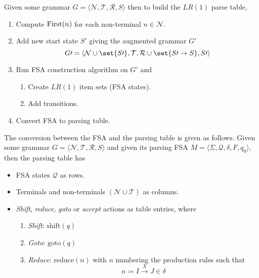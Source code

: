 \begin{definition}
    Given some grammar $G = \langle \mathcal{N}, \mathcal{T}, \mathcal{R}, S \rangle$ then to build the $LR(1)$ parse table,
    \begin{enumerate}
        \item Compute $\mathrm{First}{(n)}$ for each non-terminal $n \in \mathcal{N}$.
        \item Add new start state $S\prime$ giving the augmented grammar $G\prime$
        \begin{equation}
            G\prime = \langle \mathcal{N} \cup \set{S\prime}, \mathcal{T}, \mathcal{R} \cup \set{S\prime \to S}, S\prime \rangle
        \end{equation}
        \item Run FSA construction algorithm on $G\prime$ and
        \begin{enumerate}
            \item Create $LR(1)$ item sets (FSA states).
            \item Add transitions.
        \end{enumerate}
        \item Convert FSA to parsing table.
    \end{enumerate}
    
    The conversion between the FSA and the parsing table is given as follows. Given some grammar $G = \langle \mathcal{N}, \mathcal{T}, \mathcal{R}, S \rangle$ and given its parsing FSA $M = \langle \Sigma, \mathcal{Q}, \delta, F, q_0 \rangle$, then the parsing table has
    \begin{itemize}
        \item FSA states $\mathcal{Q}$ as rows.
        \item Terminals and non-terminals $(\mathcal{N} \cup \mathcal{T})$ as columns.
        \item \textit{Shift}, \textit{reduce}, \textit{goto} or \textit{accept} actions as table entries, where
        \begin{enumerate}
            \item \textit{Shift}: $\mathrm{shift}(q)$
            \item \textit{Goto}: $\mathrm{goto}(q)$
            \item \textit{Reduce}: $\mathrm{reduce}(n)$ with $n$ numbering the production rules such that
            \begin{equation}
                n \coloneqq I \xrightarrow{X} J \in \delta
            \end{equation}
        \end{enumerate}
    \end{itemize}
    

\end{definition}
